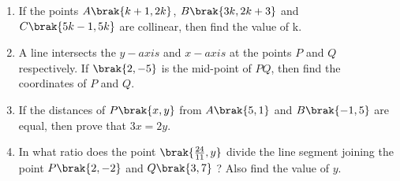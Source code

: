 \begin{enumerate}
\item If the points $A\brak{k+1, 2k}$, $B\brak{3k, 2k + 3}$  and $C\brak{5k-1, 5k}$ are collinear, then find the value of k.
\item A line intersects the $y-axis$ and $x-axis$ at the points $P$ and $Q$ respectively. If $\brak{2,-5}$ is the mid-point of $PQ$, then find the coordinates of $P$ and $Q$.
\item If the distances of $P\brak{x,y}$ from $A\brak{5,1}$ and $B\brak{-1,5}$ are equal, then prove that $ 3x=2y$.
\item In what ratio does the point $\brak{\frac{24}{11},y}$  divide the line segment joining the point $P\brak{2,-2}$ and $Q\brak{3,7}$ ? Also find the value of $y$.
\end{enumerate}
